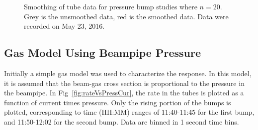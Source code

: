 \begin{figure}
	\centering
	\caption[Smoothing of \he tube data for pressure bump studies]{Smoothing of \he tube data for pressure bump studies where $n=20$. Grey is the unsmoothed data, red is the smoothed data. Data were recorded on May 23, 2016.}
	\label{fig:smoothPlot}
\end{figure}




\subsection{Gas Model Using Beampipe Pressure}

	Initially a simple gas model was used to characterize the response. In this model, it is assumed that the beam-gas cross section is proportional to the pressure in the beampipe. In Fig~\ref{fig:rateVsPressCur}, the rate in the \he tubes is plotted as a function of current times pressure. Only the rising portion of the bumps is plotted, corresponding to time (HH:MM) ranges of 11:40-11:45 for the first bump, and 11:50-12:02 for the second bump. Data are binned in 1 second time bins.


